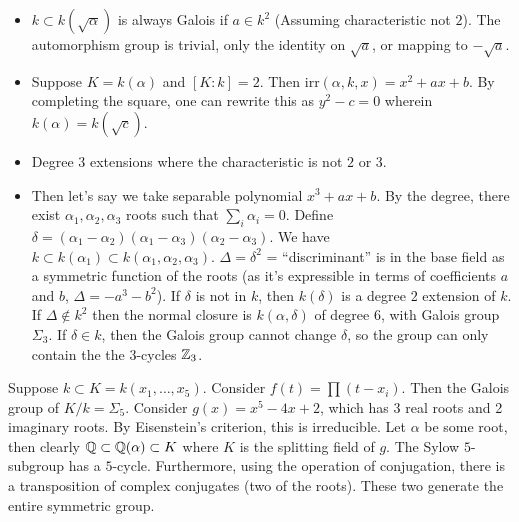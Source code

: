 \begin{example}
    \begin{itemize}
        \item $k \subset k(\sqrt{\alpha})$ is always Galois if $a \in k^2$ (Assuming characteristic not $2$).
        The automorphism group is trivial, only the identity on $\sqrt{a}$, or mapping to $-\sqrt{a}$.
        \item Suppose $K = k(\alpha)$ and $[K: k] = 2$. Then $\text{irr}(\alpha, k, x) = x^2 + ax + b$.
        By completing the square, one can rewrite this as $y^2 - c = 0$ wherein $k(\alpha) = k(\sqrt{c})$.
        \item Degree 3 extensions where the characteristic is not $2$ or $3$.
        \item Then let's say we take separable polynomial $x^3 + ax + b$.
        By the degree, there exist $\alpha_1, \alpha_2, \alpha_3$ roots
        such that $\sum_i \alpha_i = 0$. 
        Define $\delta = (\alpha_1 - \alpha_2)(\alpha_1 - \alpha_3)(\alpha_2 - \alpha_3)$.
        We have $k \subset k(\alpha_1) \subset k(\alpha_1, \alpha_2, \alpha_3)$.
        $\Delta = \delta^2$ = ``discriminant'' is in the base field
        as a symmetric function of the roots (as it's expressible in terms of coefficients $a$ and $b$, $\Delta = - a^3 - b^2$).
        If $\delta$ is not in $k$, then $k(\delta)$ is a degree $2$ extension of $k$.
        If $\Delta \notin k^2$ then the normal closure is $k(\alpha, \delta)$ of degree $6$,
        with Galois group $\Sigma_3$. If $\delta \in k$, then the Galois group
        cannot change $\delta$, so the group can only contain the the 3-cycles $\operatorname{\mathbb{Z}}_3$.
    \end{itemize}
\end{example}

Suppose $k \subset K = k(x_1, \dots, x_5)$. Consider $f(t) = \prod (t-x_i)$.
Then the Galois group of $K/k = \Sigma_5$. Consider $g(x)= x^5 -4x + 2$,
which has $3$ real roots and 2 imaginary roots. By Eisenstein's criterion, this
is irreducible. Let $\alpha$ be some root,
then clearly $\operatorname{\mathbb{Q}} \subset \operatorname{\mathbb{Q}}(\alpha) \subset K$ where $K$ is the splitting field of $g$.
The Sylow $5$-subgroup has a $5$-cycle.
Furthermore, using the operation of conjugation, there is a transposition of complex
conjugates (two of the roots). These two generate the entire symmetric group.